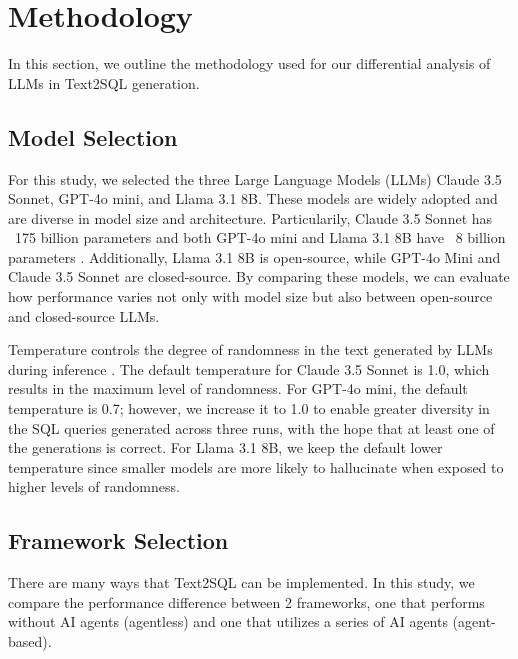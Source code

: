 \documentclass[10pt,twocolumn]{article}
\begin{document}
\section{Methodology}

In this section, we outline the methodology used for our differential analysis of LLMs in Text2SQL generation.

\subsection{Model Selection}

For this study, we selected the three Large Language Models (LLMs) Claude 3.5 Sonnet, GPT-4o mini, and Llama 3.1 8B. These models are widely adopted and are diverse in model size and architecture. Particularily, Claude 3.5 Sonnet has ~175 billion parameters and both GPT-4o mini and Llama 3.1 8B have ~8 billion parameters \cite{model-size}. Additionally, Llama 3.1 8B is open-source, while GPT-4o Mini and Claude 3.5 Sonnet are closed-source. By comparing these models, we can evaluate how performance varies not only with model size but also between open-source and closed-source LLMs.

Temperature controls the degree of randomness in the text generated by LLMs during inference \cite{temperature}. The default temperature for Claude 3.5 Sonnet is 1.0, which results in the maximum level of randomness. For GPT-4o mini, the default temperature is 0.7; however, we increase it to 1.0 to enable greater diversity in the SQL queries generated across three runs, with the hope that at least one of the generations is correct. For Llama 3.1 8B, we keep the default lower temperature since smaller models are more likely to hallucinate when exposed to higher levels of randomness.

\subsection{Framework Selection}

There are many ways that Text2SQL can be implemented. In this study, we compare the performance difference between 2 frameworks, one that performs without AI agents (agentless) and one that utilizes a series of AI agents (agent-based).
\end{document}
